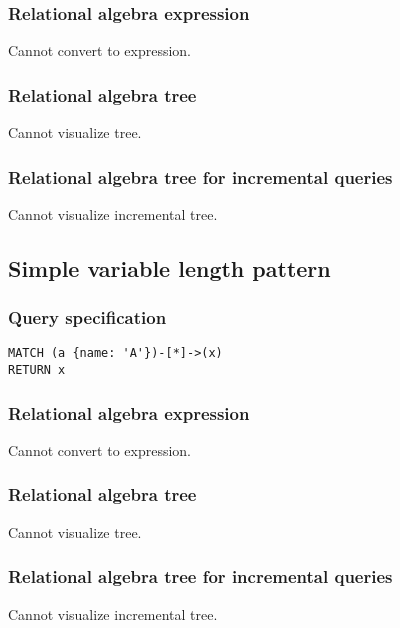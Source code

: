 \subsubsection*{Relational algebra expression}

Cannot convert to expression.

\subsubsection*{Relational algebra tree}

Cannot visualize tree.

\subsubsection*{Relational algebra tree for incremental queries}

Cannot visualize incremental tree.

\subsection{Simple variable length pattern}

\subsubsection*{Query specification}

\begin{lstlisting}
MATCH (a {name: 'A'})-[*]->(x)
RETURN x
\end{lstlisting}

\subsubsection*{Relational algebra expression}

Cannot convert to expression.

\subsubsection*{Relational algebra tree}

Cannot visualize tree.

\subsubsection*{Relational algebra tree for incremental queries}

Cannot visualize incremental tree.

